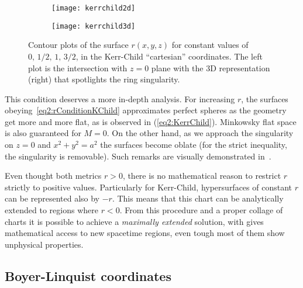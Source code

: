 \begin{figure}[h]
    \centering
    \begin{subfigure}[c]{0.45\textwidth}
        \texttt{[image: kerrchild2d]}
    \end{subfigure}
    \hspace{1cm}
    \begin{subfigure}[c]{0.35\textwidth}
        \texttt{[image: kerrchild3d]}
    \end{subfigure}
    \caption{Contour plots of the surface $r(x,y,z)$ for constant values of $0,\,1/2,\,1,\,3/2$, in the Kerr-Child ``cartesian'' coordinates. The left plot is the intersection with $z=0$ plane with the 3D representation (right) that spotlights the ring singularity.}\label{fig2:kerrchild}
\end{figure}

This condition deserves a more in-depth analysis.
For increasing $r$, the surfaces obeying~\eqref{eq2:rConditionKChild} approximates perfect spheres as the geometry get more and more flat, as is observed in (\ref{eq2:KerrChild}).
Minkowsky flat space is also guaranteed for $M=0$.
On the other hand, as we approach the singularity on $z=0$ and $x^2+y^2 = a^2$ the surfaces become oblate (for the strict inequality, the singularity is removable).
Such remarks are visually demonstrated in~.

Even thought both metrics $r>0$, there is no mathematical reason to restrict $r$ strictly to positive values.
Particularly for Kerr-Child, hypersurfaces of constant $r$ can be represented also by $-r$. 
This means that this chart can be analytically extended to regions where $r<0$.
From this procedure and a proper collage of charts it is possible to achieve a \emph{maximally extended} solution, with gives mathematical access to new spacetime regions, even tough most of them show unphysical properties.


\subsection{Boyer-Linquist coordinates}

